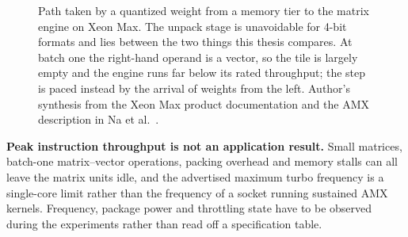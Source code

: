 \begin{figure}[htbp]
\centering
{}
\caption{Path taken by a quantized weight from a memory tier to the
matrix engine on Xeon Max.  The unpack stage is unavoidable for 4-bit
formats and lies between the two things this thesis compares.  At batch
one the right-hand operand is a vector, so the tile is largely empty and
the engine runs far below its rated throughput; the step is paced
instead by the arrival of weights from the left.  Author's synthesis
from the Xeon Max product documentation and the AMX description in Na et
al.~\cite{intelmax,na2024llmcpu}.}
\label{fig:amx-path}
\end{figure}

\textbf{Peak instruction throughput is not an application result.}  Small
matrices, batch-one matrix--vector operations, packing overhead and
memory stalls can all leave the matrix units idle, and the advertised
maximum turbo frequency is a single-core limit rather than the frequency
of a socket running sustained AMX kernels.  Frequency, package power and
throttling state have to be observed during the experiments rather than
read off a specification table.


